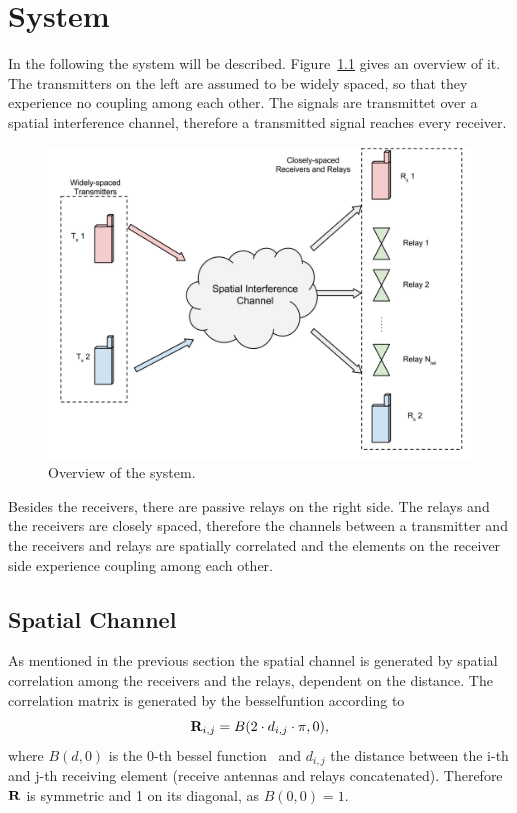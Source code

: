 \chapter{System}
\label{sec:system}

In the following the system will be described.
Figure~\ref{fig:system} gives an overview of it.
The transmitters on the left are assumed to be widely spaced, so that they experience no coupling among each other.
The signals are transmittet over a spatial interference channel, therefore a transmitted signal reaches every receiver.
\begin{figure}[h]
\begin{center}
\includegraphics[width=\textwidth]{images/System.png}
\caption{Overview of the system.}
\label{fig:system}
\end{center}
\end{figure}

Besides the receivers, there are passive relays on the right side.
The relays and the receivers are closely spaced, therefore the channels between a transmitter and the receivers and relays are spatially correlated and the elements on the receiver side experience coupling among each other.

\section{Spatial Channel}
\label{sec:spatial}

As mentioned in the previous section the spatial channel is generated by spatial correlation among the receivers and the relays, dependent on the distance.
The correlation matrix is generated by the besselfuntion according to
\begin{equation}
\label{eq:spatial_corr}
\mathbf{R}_{i,j} = B(2\cdot d_{i,j}\cdot \pi,0),
\end{equation}
where $B(d,0)$ is the 0-th bessel function~\cite[p.191]{Kreyszig} and $d_{i,j}$ the distance between the i-th and j-th receiving element (receive antennas and relays concatenated).
Therefore $\mathbf{R}$ is symmetric and 1 on its diagonal, as $B(0,0)=1$.

